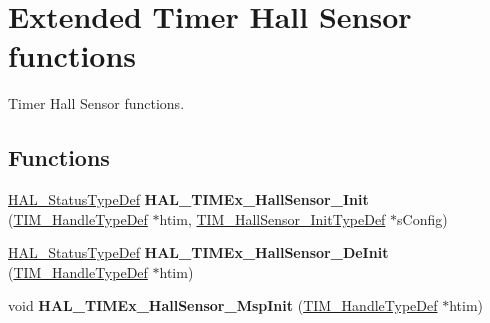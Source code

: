 \hypertarget{group___t_i_m_ex___exported___functions___group1}{}\section{Extended Timer Hall Sensor functions}
\label{group___t_i_m_ex___exported___functions___group1}


Timer Hall Sensor functions.  


\subsection*{Functions}
\begin{DoxyCompactItemize}
\item 
\mbox{\label{group___t_i_m_ex___exported___functions___group1_ga9edc6a00a673eb7c07b0c3cf86a95169}} 
\mbox{\hyperlink{stm32f7xx__hal__def_8h_a63c0679d1cb8b8c684fbb0632743478f}{H\+A\+L\+\_\+\+Status\+Type\+Def}} {\bfseries H\+A\+L\+\_\+\+T\+I\+M\+Ex\+\_\+\+Hall\+Sensor\+\_\+\+Init} (\mbox{\hyperlink{struct_t_i_m___handle_type_def}{T\+I\+M\+\_\+\+Handle\+Type\+Def}} $\ast$htim, \mbox{\hyperlink{struct_t_i_m___hall_sensor___init_type_def}{T\+I\+M\+\_\+\+Hall\+Sensor\+\_\+\+Init\+Type\+Def}} $\ast$s\+Config)
\item 
\mbox{\label{group___t_i_m_ex___exported___functions___group1_ga61f3c18eb8fe53b65b55ec855072631d}} 
\mbox{\hyperlink{stm32f7xx__hal__def_8h_a63c0679d1cb8b8c684fbb0632743478f}{H\+A\+L\+\_\+\+Status\+Type\+Def}} {\bfseries H\+A\+L\+\_\+\+T\+I\+M\+Ex\+\_\+\+Hall\+Sensor\+\_\+\+De\+Init} (\mbox{\hyperlink{struct_t_i_m___handle_type_def}{T\+I\+M\+\_\+\+Handle\+Type\+Def}} $\ast$htim)
\item 
\mbox{\label{group___t_i_m_ex___exported___functions___group1_ga88d9e7c4bc86e1a1190fda06e04552ea}} 
void {\bfseries H\+A\+L\+\_\+\+T\+I\+M\+Ex\+\_\+\+Hall\+Sensor\+\_\+\+Msp\+Init} (\mbox{\hyperlink{struct_t_i_m___handle_type_def}{T\+I\+M\+\_\+\+Handle\+Type\+Def}} $\ast$htim)
\item 
\mbox{\label{group___t_i_m_ex___exported___functions___group1_gac19734439bdfa549b7fb5d85f3c0720d}} 

\end{DoxyCompactItemize}
